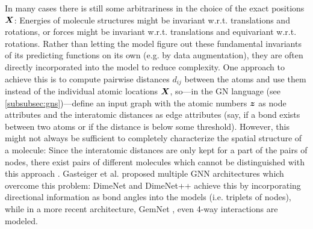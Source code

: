 In many cases there is still some arbitrariness in the choice of the 
exact positions $\boldsymbol{X}$: Energies of molecule structures might be invariant w.r.t. 
translations and rotations, or forces might be invariant w.r.t. 
translations and equivariant w.r.t. rotations. Rather than letting the model figure out
these fundamental invariants of its predicting functions on its own (e.g. by 
data augmentation), they are often directly incorporated into the model to reduce 
complexity. One approach to achieve this is to compute pairwise distances $d_{ij}$ 
between the atoms and use them instead of the individual atomic locations $\boldsymbol{X}$, 
so---in the GN language (see \ref{subsubsec:gns})---define an input graph with the atomic numbers $\boldsymbol{z}$ as 
node attributes and the interatomic distances as edge attributes (say, if a bond exists
between two atoms or if the distance is below some threshold). However, this might
not always be sufficient to completely characterize the spatial structure of a molecule:
Since the interatomic distances are only kept for a part of the pairs of 
nodes, there exist pairs of different molecules which cannot be
distinguished with this approach \cite[Appendix A]{DBLP:journals/corr/abs-2003-03123}.
Gasteiger et al. proposed multiple GNN architectures which overcome this
problem: DimeNet \cite{DBLP:journals/corr/abs-2003-03123} and 
DimeNet++ \cite{https://doi.org/10.48550/arxiv.2011.14115} achieve this
by incorporating directional information as bond angles into the models
(i.e. triplets of nodes), while in a more recent architecture, GemNet 
\cite{https://doi.org/10.48550/arxiv.2106.08903}, even 4-way interactions are
modeled.




